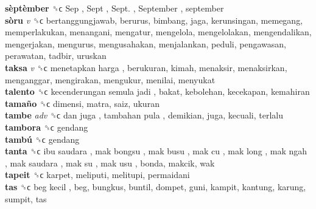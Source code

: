 \textbf{sèptèmber} ␝ϲ   Sep ,  Sept ,  Sept. ,  September , september  \\
\textbf{sòru} \emph{v}  ␝ϲ  bertanggungjawab, berurus, bimbang, jaga, kerunsingan, memegang, memperlakukan, menangani, mengatur, mengelola, mengelolakan, mengendalikan, mengerjakan, mengurus, mengusahakan, menjalankan, peduli, pengawasan, perawatan, tadbir, uruskan  \\
\textbf{taksa} \emph{v}  ␝ϲ   menetapkan harga , berukuran, kimah, menaksir, menaksirkan, menganggar, mengirakan, mengukur, menilai, menyukat  \\
\textbf{talento} ␝ϲ   kecenderungan semula jadi , bakat, kebolehan, kecekapan, kemahiran  \\
\textbf{tamaño} ␝ϲ  dimensi, matra, saiz, ukuran  \\
\textbf{tambe} \emph{adv}  ␝ϲ   dan juga ,  tambahan pula , demikian, juga, kecuali, terlalu  \\
\textbf{tambora} ␝ϲ  gendang  \\
\textbf{tambú} ␝ϲ  gendang  \\
\textbf{tanta} ␝ϲ   ibu saudara ,  mak bongsu ,  mak busu ,  mak cu ,  mak long ,  mak ngah ,  mak saudara ,  mak su ,  mak usu , bonda, makcik, wak  \\
\textbf{tapeit} ␝ϲ  karpet, meliputi, melitupi, permaidani  \\
\textbf{tas} ␝ϲ   beg kecil , beg, bungkus, buntil, dompet, guni, kampit, kantung, karung, sumpit, tas  \\
